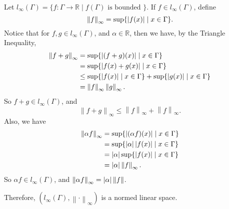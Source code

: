 \documentclass[notoc,notitlepage]{tufte-book}
\newcommand{\norm}[1]{\left\| #1 \right\|}
\begin{document}
\begin{eg}\label{eg:l_infty_on_gamma}
  Let $l_\infty(\Gamma) = \{ f : \Gamma \to \mathbb{R} \mid f(\Gamma) \text{ is bounded } \}$. If $f \in l_\infty(\Gamma)$, define
  \begin{equation*}
    \norm{f}_\infty = \sup \{ \abs{f(x)} \mid x \in \Gamma \}.
  \end{equation*}
  Notice that for $f, g \in l_\infty(\Gamma)$, and $\alpha \in \mathbb{R}$, then we have, by the Triangle Inequality,
  \begin{align*}
    \norm{f + g}_\infty &= \sup \{ \abs{ (f + g)(x) } \mid x \in \Gamma \} \\
                        &= \sup \{ \abs{ f(x) + g(x) } \mid x \in \Gamma \} \\
                        &\leq \sup \{ \abs{ f(x) } \mid x \in \Gamma \} + \sup \{ \abs{ g(x) } \mid x \in \Gamma \} \\
                        &= \norm{f}_\infty \norm{g}_\infty.
  \end{align*}
  So $f + g \in l_\infty(\Gamma)$, and
  \begin{equation*}
    \norm{f + g}_\infty \leq \norm{f}_\infty + \norm{f}_\infty.
  \end{equation*}
  Also, we have
  \begin{align*}
    \norm{\alpha f}_\infty &= \sup \{ \abs{ (\alpha f)(x) } \mid x \in \Gamma \} \\
                           &= \sup \{ \abs{\alpha} \abs{ f(x) } \mid x \in \Gamma \} \\
                           &= \abs{\alpha} \sup \{ \abs{f(x)} \mid x \in \Gamma \} \\
                           &= \abs{\alpha} \norm{f}_\infty.
  \end{align*}
  So $\alpha f \in l_\infty(\Gamma)$, and $\norm{\alpha f}_\infty = \abs{\alpha} \norm{f}$.

  Therefore, $(l_\infty(\Gamma), \norm\cdot_\infty)$ is a normed linear space.
\end{eg}
\end{document}
